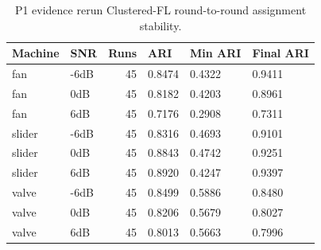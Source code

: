 \begin{table}[t]
\centering
\scriptsize
\setlength{\tabcolsep}{3pt}
\caption{P1 evidence rerun Clustered-FL round-to-round assignment stability.}
\label{tab:p1-evidence-cluster-stability}
\begin{tabular}{llrlll}
\toprule
Machine & SNR & Runs & ARI & Min ARI & Final ARI \\
\midrule
fan & -6dB & 45 & 0.8474 & 0.4322 & 0.9411 \\
fan & 0dB & 45 & 0.8182 & 0.4203 & 0.8961 \\
fan & 6dB & 45 & 0.7176 & 0.2908 & 0.7311 \\
slider & -6dB & 45 & 0.8316 & 0.4693 & 0.9101 \\
slider & 0dB & 45 & 0.8843 & 0.4742 & 0.9251 \\
slider & 6dB & 45 & 0.8920 & 0.4247 & 0.9397 \\
valve & -6dB & 45 & 0.8499 & 0.5886 & 0.8480 \\
valve & 0dB & 45 & 0.8206 & 0.5679 & 0.8027 \\
valve & 6dB & 45 & 0.8013 & 0.5663 & 0.7996 \\
\bottomrule
\end{tabular}
\end{table}
